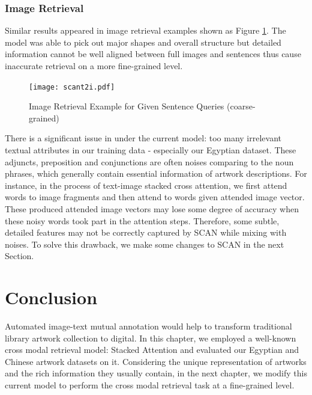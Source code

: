 \subsubsection{Image Retrieval}
Similar results appeared in image retrieval examples shown as Figure \ref{fig:scant2i}. The model was able to pick out major shapes and overall structure but detailed information cannot be well aligned between full images and sentences thus cause inaccurate retrieval on a more fine-grained level.

\begin{figure}[h!]
\centering
\texttt{[image: scant2i.pdf]}
\caption{Image Retrieval Example for Given Sentence Queries (coarse-grained)}
\label{fig:scant2i}
\end{figure}

There is a significant issue in under the current model: too many irrelevant textual attributes in our training data - especially our Egyptian dataset. These adjuncts, preposition and conjunctions are often noises comparing to the noun phrases, which generally contain essential information of artwork descriptions. For instance, in the process of text-image stacked cross attention, we first attend words to image fragments and then attend to words given attended image vector. These produced attended image vectors may lose some degree of accuracy when these noisy words took part in the attention steps. Therefore, some subtle, detailed features may not be correctly captured by SCAN while mixing with noises. To solve this drawback, we make some changes to SCAN in the next Section.


\section{Conclusion}
Automated image-text mutual annotation would help to transform traditional library artwork collection to digital. In this chapter, we employed a well-known cross modal retrieval model: Stacked Attention and evaluated our Egyptian and Chinese artwork datasets on it. Considering the unique representation of artworks and the rich information they usually contain, in the next chapter, we modify this current model to perform the cross modal retrieval task at a fine-grained level.


